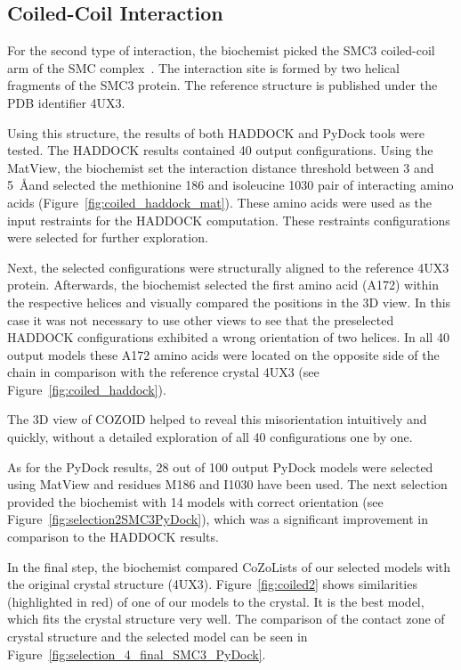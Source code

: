\documentclass{bmcart}
\begin{document}
\subsection{Coiled-Coil Interaction}
For the second type of interaction, the biochemist picked the SMC3 coiled-coil arm of the SMC complex~\cite{Gligoris}.
The interaction site is formed by two helical fragments of the SMC3 protein.
The reference structure is published under the PDB identifier 4UX3.  

Using this structure, the results of both HADDOCK and PyDock tools were tested.
The HADDOCK results contained 40 output configurations.
Using the MatView, the biochemist set the interaction distance threshold between 3 and 5~\AA and selected the methionine 186 and isoleucine 1030 pair of interacting amino acids (Figure~\ref{fig:coiled_haddock_mat}). 
These amino acids were used as the input restraints for the HADDOCK computation.
These restraints configurations were selected for further exploration.

Next, the selected configurations were structurally aligned to the reference 4UX3 protein.
Afterwards, the biochemist selected the first amino acid (A172) within the respective helices and visually compared the positions in the 3D view.
In this case it was not necessary to use other views to see that the preselected HADDOCK configurations exhibited a wrong orientation of two helices. 
In all 40 output models these A172 amino acids were located on the opposite side of the chain in comparison with the reference crystal 4UX3 (see Figure~\ref{fig:coiled_haddock}).

The 3D view of COZOID helped to reveal this misorientation intuitively and quickly, without a detailed exploration of all 40 configurations one by one.

As for the PyDock results, 28 out of 100 output PyDock models were selected using MatView and residues M186 and I1030 have been used.
The next selection provided the biochemist with 14 models with correct orientation (see Figure~\ref{fig:selection2SMC3PyDock}), which was a significant improvement in comparison to the HADDOCK results.

In the final step, the biochemist compared CoZoLists of our selected models with the original crystal structure (4UX3). 
Figure~\ref{fig:coiled2} shows similarities (highlighted in red) of one of our models to the crystal. It is the best model, which fits the crystal structure very well. The comparison of the contact zone of crystal structure and the selected model can be seen in Figure~\ref{fig:selection_4_final_SMC3_PyDock}.
\end{document}
